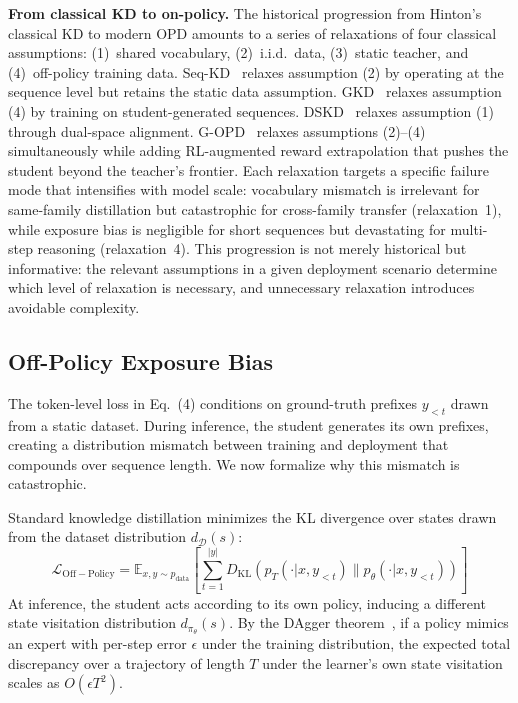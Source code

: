 \documentclass{article} %
\newcommand{\E}{\mathbb{E}}
\newcommand{\KL}{D_{\mathrm{KL}}}
\newcommand{\ptheta}{p_\theta}
\newcommand{\pteacher}{p_T}
\newcommand{\pdata}{p_{\mathrm{data}}}
\newcommand{\loss}{\mathcal{L}}
\begin{document}
\textbf{From classical KD to on-policy.} The historical progression from Hinton's classical KD to modern OPD amounts to a series of relaxations of four classical assumptions: (1)~shared vocabulary, (2)~i.i.d.\ data, (3)~static teacher, and (4)~off-policy training data. Seq-KD~\citep{kim2016sequence} relaxes assumption (2) by operating at the sequence level but retains the static data assumption. GKD~\citep{2306.13649} relaxes assumption (4) by training on student-generated sequences. DSKD~\citep{2504.11426} relaxes assumption (1) through dual-space alignment. G-OPD~\citep{2602.12125} relaxes assumptions (2)--(4) simultaneously while adding RL-augmented reward extrapolation that pushes the student beyond the teacher's frontier. Each relaxation targets a specific failure mode that intensifies with model scale: vocabulary mismatch is irrelevant for same-family distillation but catastrophic for cross-family transfer (relaxation~1), while exposure bias is negligible for short sequences but devastating for multi-step reasoning (relaxation~4). This progression is not merely historical but informative: the relevant assumptions in a given deployment scenario determine which level of relaxation is necessary, and unnecessary relaxation introduces avoidable complexity.

\subsection{Off-Policy Exposure Bias}

The token-level loss in Eq.~(4) conditions on ground-truth prefixes $y_{<t}$ drawn from a static dataset. During inference, the student generates its own prefixes, creating a distribution mismatch between training and deployment that compounds over sequence length. We now formalize why this mismatch is catastrophic.

Standard knowledge distillation minimizes the KL divergence over states drawn from the dataset distribution $d_{\mathcal{D}}(s)$:
\begin{equation}
    \loss_{\mathrm{Off-Policy}} = \E_{x, y \sim \pdata} \left[ \sum_{t=1}^{|y|} \KL(\pteacher(\cdot | x, y_{<t}) \parallel \ptheta(\cdot | x, y_{<t})) \right]
\end{equation}
At inference, the student acts according to its own policy, inducing a different state visitation distribution $d_{\pi_\theta}(s)$. By the DAgger theorem~\citep{ross2011reduction}, if a policy mimics an expert with per-step error $\epsilon$ under the training distribution, the expected total discrepancy over a trajectory of length $T$ under the learner's own state visitation scales as $O(\epsilon T^2)$.
\end{document}
